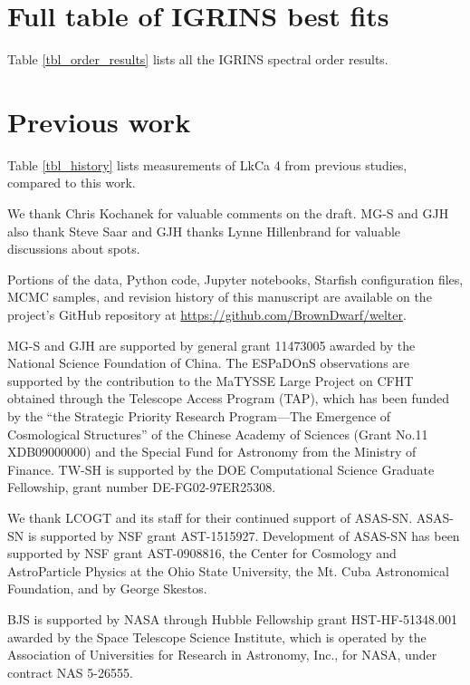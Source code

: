 \documentclass[twocolumn]{emulateapj}%
\newcommand{\name}{LkCa 4 }
\begin{document}
\section{Full table of IGRINS best fits}

Table \ref{tbl_order_results} lists all the IGRINS spectral order results.
\LongTables


\section{Previous work}

Table \ref{tbl_history} lists measurements of \name from previous studies, compared to this work.



\acknowledgements

We thank Chris Kochanek for valuable comments on the draft.  MG-S and GJH also thank Steve Saar and GJH thanks Lynne Hillenbrand for valuable discussions about spots.

Portions of the data, Python code, Jupyter notebooks, Starfish configuration files, MCMC samples, and revision history of this manuscript are available on the project's GitHub repository at \url{https://github.com/BrownDwarf/welter}.

MG-S and GJH are supported by general grant 11473005 awarded by the National Science Foundation of China.   The ESPaDOnS observations are supported by the contribution to the MaTYSSE Large Project on CFHT obtained through the Telescope Access Program (TAP), which has been funded by the ``the Strategic Priority Research Program---The Emergence of Cosmological Structures'' of the Chinese Academy of Sciences (Grant No.11 XDB09000000) and the Special Fund for Astronomy from the Ministry of Finance. 
TW-SH is supported by the DOE Computational Science Graduate Fellowship, grant number DE-FG02-97ER25308.

We thank LCOGT and its staff for their continued support of ASAS-SN. ASAS-SN is supported by NSF grant AST-1515927. Development of ASAS-SN has been supported by NSF grant AST-0908816, the Center for Cosmology and AstroParticle Physics at the Ohio State University, the Mt. Cuba Astronomical Foundation, and by George Skestos. 

BJS is supported by NASA through Hubble Fellowship grant HST-HF-51348.001 awarded by the Space Telescope Science Institute, which is operated by the Association of Universities for Research in Astronomy, Inc., for NASA, under contract NAS 5-26555.  
\end{document}
